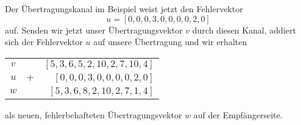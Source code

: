 Der Übertragungskanal im Beispiel weist jetzt den Fehlervektor 
\[
u = [0, 0, 0, 3, 0, 0, 0, 0, 2, 0]
\]
auf.
Senden wir jetzt unser Übertragungsvektor $v$ durch diesen Kanal, addiert sich der Fehlervektor $u$ auf unsere Übertragung und wir erhalten 
\begin{center}
	
	\begin{tabular}{c | c r }
		$v$ & & $[5,3,6,5,2,10,2,7,10,4]$\\
		$u$ & $+$ & $[0,0,0,3,0,0,0,0,2,0]$\\
		\hline
		$w$ & & $[5,3,6,8,2,10,2,7,1,4]$\\
	\end{tabular}
	
	
\end{center}
als neuen, fehlerbehafteten Übertragungsvektor $w$ auf der Empfängerseite.
%
%
%
%
%
%
%
%
%
